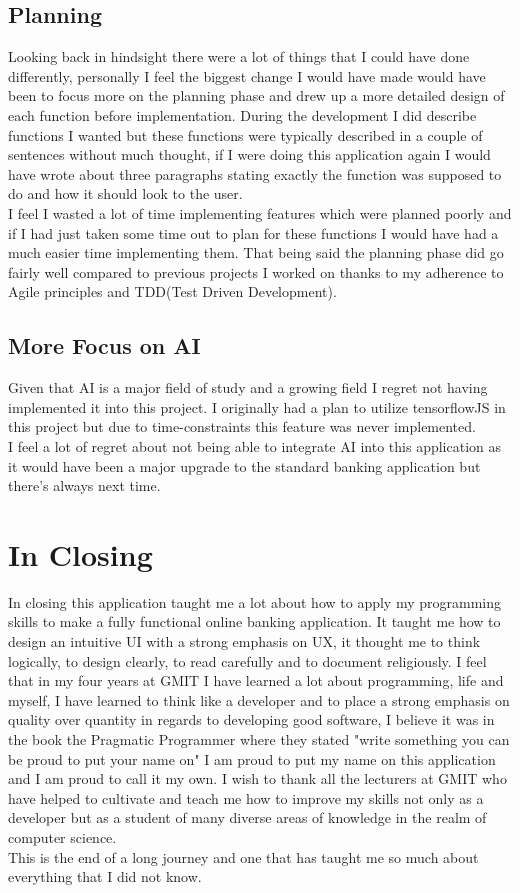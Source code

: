 \subsection{Planning}
Looking back in hindsight there were a lot of things that I could have done differently, personally I feel the biggest change I would have made would have been to focus more on the planning phase and drew up a more detailed design of each function before implementation.  During the development I did describe functions I wanted but these functions were typically described in a couple of sentences without much thought, if I were doing this application again I would have wrote about three paragraphs stating exactly the function was supposed to do and how it should look to the user.
\\
I feel I wasted a lot of time implementing features which were planned poorly and if I had just taken some time out to plan for these functions I would have had a much easier time implementing them.  That being said the planning phase did go fairly well compared to previous projects I worked on thanks to my adherence to Agile principles and TDD(Test Driven Development).
\subsection{More Focus on AI}
Given that AI is a major field of study and a growing field I regret not having implemented it into this project.  I originally had a plan to utilize tensorflowJS in this project but due to time-constraints this feature was never implemented.
\\
I feel a lot of regret about not being able to integrate AI into this application as it would have been a major upgrade to the standard banking application but there's always next time.
\section{In Closing}
In closing this application taught me a lot about how to apply my programming skills to make a fully functional online banking application.  It taught me how to design an intuitive UI with a strong emphasis on UX, it thought me to think logically, to design clearly, to read carefully and to document religiously.  I feel that in my four years at GMIT I have learned a lot about programming, life and myself,  I have learned to think like a developer and to place a strong emphasis on quality over quantity in regards to developing good software,  I believe it was in the book the Pragmatic Programmer where they stated "write something you can be proud to put your name on" I am proud to put my name on this application and I am proud to call it my own.  I wish to thank all the lecturers at GMIT who have helped to cultivate and teach me how to improve my skills not only as a developer but as a student of many diverse areas of knowledge in the realm of computer science.
\\
This is the end of a long journey and one that has taught me so much about everything that I did not know.
